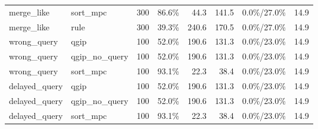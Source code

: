 \begin{tabular}{llrrrrrr}
merge\_like & sort\_mpc & 300 & 86.6\% & 44.3 & 141.5 & 0.0\%/27.0\% & 14.9 \\
merge\_like & rule & 300 & 39.3\% & 240.6 & 170.5 & 0.0\%/27.0\% & 14.9 \\
wrong\_query & qgip & 100 & 52.0\% & 190.6 & 131.3 & 0.0\%/23.0\% & 14.9 \\
wrong\_query & qgip\_no\_query & 100 & 52.0\% & 190.6 & 131.3 & 0.0\%/23.0\% & 14.9 \\
wrong\_query & sort\_mpc & 100 & 93.1\% & 22.3 & 38.4 & 0.0\%/23.0\% & 14.9 \\
delayed\_query & qgip & 100 & 52.0\% & 190.6 & 131.3 & 0.0\%/23.0\% & 14.9 \\
delayed\_query & qgip\_no\_query & 100 & 52.0\% & 190.6 & 131.3 & 0.0\%/23.0\% & 14.9 \\
delayed\_query & sort\_mpc & 100 & 93.1\% & 22.3 & 38.4 & 0.0\%/23.0\% & 14.9 \\
\bottomrule
\end{tabular}
